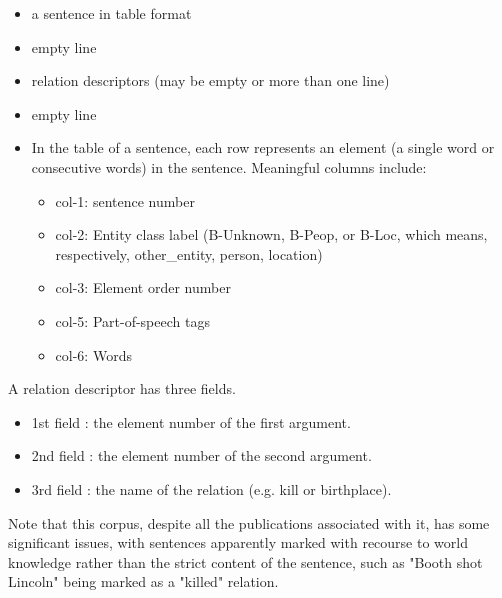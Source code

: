 \documentclass{book}
\begin{document}
\begin{itemize}
\item a sentence in table format
\item  empty line
\item  relation descriptors (may be empty or more than one line)
\item  empty line
\item  In the table of a sentence, each row represents an element (a single word or 
consecutive words) in the sentence. Meaningful columns include:
\begin{itemize}
\item  col-1: sentence number
\item  col-2: Entity class label (B-Unknown, B-Peop, or B-Loc, which means, 
respectively, other\_entity, person, location)
\item  col-3: Element order number
\item  col-5: Part-of-speech tags
\item  col-6: Words
\end{itemize}
\end{itemize}

 A relation descriptor has three fields.

\begin{itemize}
\item  1st field : the element number of the first argument.
\item  2nd field : the element number of the second argument.
\item  3rd field : the name of the relation (e.g. kill or birthplace).
\end{itemize}

Note that this corpus, despite all the publications associated with it, has some
significant issues, with sentences apparently marked with recourse to world knowledge
rather than the strict content of the sentence, such as "Booth shot Lincoln" being
marked as a "killed" relation.






\newpage
\label{classindex}
\printindex[classes] %
\printindex
\end{document}
